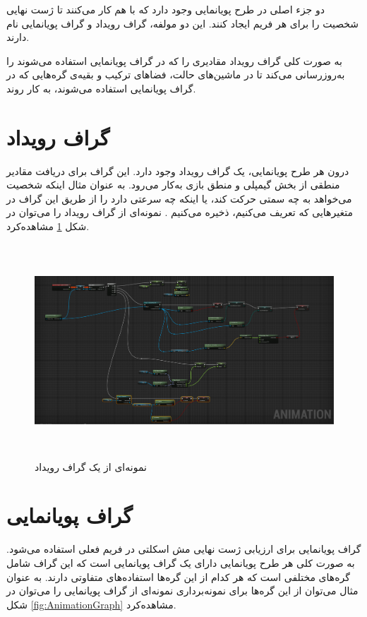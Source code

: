 دو جزء اصلی در طرح پویانمایی وجود دارد که با هم کار می‌کنند تا ژست نهایی شخصیت را برای هر 
فریم ایجاد کنند.
این دو مولفه، گراف رویداد و گراف پویانمایی نام دارند.

به صورت کلی گراف رویداد مقادیری را که در گراف پویانمایی استفاده می‌شوند را به‌روز‌رسانی می‌‌کند تا 
در ماشین‌های حالت، فضاهای ترکیب و بقیه‌ی گره‌هایی که در گراف پویانمایی
 استفاده می‌شوند، به کار روند.

\section{گراف رویداد}

درون هر طرح پویانمایی، یک گراف رویداد وجود دارد. 
این گراف برای دریافت مقادیر منطقی از بخش گیمپلی و منطق بازی به‌کار می‌رود.
به عنوان مثال اینکه شخصیت می‌خواهد به چه سمتی حرکت کند، یا اینکه چه سرعتی دارد را 
از طریق این گراف در متغیرهایی که تعریف می‌کنیم، ذخیره می‌کنیم \cite{EventGraphUnrealEngine}.
نمونه‌ای از گراف رویداد را می‌توان در شکل 
\ref{fig:EventGraph}
مشاهده‌کرد.

\begin{figure}[ht]
	\centerline{\includegraphics[width=\textwidth,height=8cm,keepaspectratio]{Figures/Ch3/EventGraph.png}}

	\caption{نمونه‌ای از یک گراف رویداد}
	\label{fig:EventGraph}
\end{figure}


\section{گراف پویا‌نمایی}

گراف پویانمایی برای ارزیابی ژست نهایی مش اسکلتی در فریم فعلی استفاده می‌شود.
به صورت کلی هر طرح پویانمایی دارای یک گراف پویانمایی است که 
این گراف شامل گره‌های مختلفی است که هر کدام از این گره‌ها استفاده‌های متفاوتی دارند.
به عنوان مثال می‌توان از این گره‌ها برای نمونه‌برداری
نمونه‌ای از گراف پویانمایی را می‌توان در شکل 
\ref{fig:AnimationGraph}
مشاهده‌کرد.


